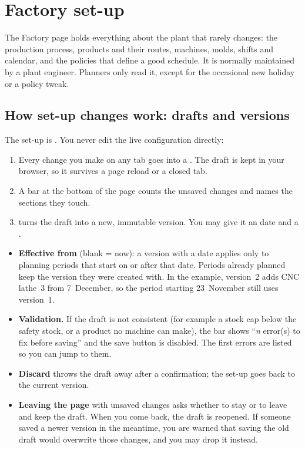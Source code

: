 \chapter{Factory set-up}\label{ch:factory}

The Factory page holds everything about the plant that rarely changes: the production process, products
and their routes, machines, molds, shifts and calendar, and the policies that define a good schedule. It is
normally maintained by a plant engineer. Planners only read it, except for the occasional new holiday or a
policy tweak.

\section{How set-up changes work: drafts and versions}\label{sec:versions-drafts}

The set-up is . You never edit the live configuration directly:

\begin{enumerate}
  \item Every change you make on any tab goes into a . The draft is kept in your browser, so it
        survives a page reload or a closed tab.
  \item A bar at the bottom of the page counts the unsaved changes and names the sections they touch.
  \item {} turns the draft into a new, immutable version. You may give it an
         date and a .
\end{enumerate}


\begin{itemize}
  \item \textbf{Effective from} (blank = now): a version with a date applies only to planning periods that start
        on or after that date. Periods already planned keep the version they were created with. In the
        example, version~2 adds CNC lathe~3 from 7~December, so the period starting 23~November still uses
        version~1.
  \item \textbf{Validation.} If the draft is not consistent (for example a stock cap below the safety stock,
        or a product no machine can make), the bar shows ``\textit{n} error(s) to fix before saving'' and the
        save button is disabled. The first errors are listed so you can jump to them.
  \item \textbf{Discard} throws the draft away after a confirmation; the set-up goes back to the current
        version.
  \item \textbf{Leaving the page} with unsaved changes asks whether to stay or to leave and keep the draft.
        When you come back, the draft is reopened. If someone saved a newer version in the meantime, you are
        warned that saving the old draft would overwrite those changes, and you may drop it instead.
\end{itemize}

